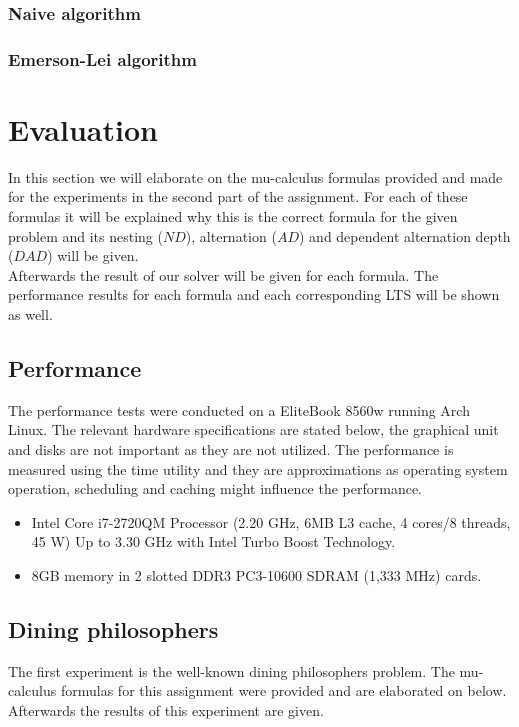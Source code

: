 \documentclass[10pt,a4paper]{article}
\begin{document}
\subsubsection{Naive algorithm}


\subsubsection{Emerson-Lei algorithm}


\section{Evaluation}\label{eval}
In this section we will elaborate on the mu-calculus formulas provided and made for the experiments in the second part of the assignment. For each of these formulas it will be explained why this is the correct formula for the given problem and its nesting ($ND$), alternation ($AD$) and dependent alternation depth ($DAD$) will be given.\\
Afterwards the result of our solver will be given for each formula. The performance results for each formula and each corresponding LTS will be shown as well.

\subsection{Performance}

The performance tests were conducted on a EliteBook 8560w running Arch Linux. The relevant hardware specifications are stated below, the graphical unit and disks are not important as they are not utilized. The performance is measured using the time utility and they are approximations as operating system operation, scheduling and caching might influence the performance.

\begin{itemize}
	\item Intel Core i7-2720QM Processor (2.20 GHz, 6MB L3 cache, 4 cores/8 threads, 45 W) Up to 3.30 GHz with Intel Turbo Boost Technology.
	
	\item 8GB memory in 2 slotted DDR3 PC3-10600 SDRAM (1,333 MHz) cards.
\end{itemize}

\subsection{Dining philosophers}
The first experiment is the well-known dining philosophers problem. The mu-calculus formulas for this assignment were provided and are elaborated on below. Afterwards the results of this experiment are given.
\end{document}
